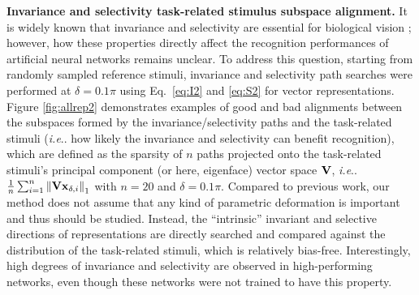 \documentclass[fleqn]{article} %
\makeatletter
\DeclareRobustCommand\onedot{\futurelet\@let@token\@onedot}
\def\@onedot{\ifx\@let@token.\else.\null\fi\xspace}
\def\ie{\emph{i.e}\onedot} \def\Ie{\emph{I.e}\onedot}
\makeatother
\begin{document}
{\bf Invariance and selectivity \vs task-related stimulus subspace alignment.} 
It is widely known that invariance and selectivity are essential for biological vision \cite{desimone1991face, ito1995size}; however, how these properties directly affect the recognition performances of artificial neural networks remains unclear.
To address this question, starting from randomly sampled reference stimuli, invariance and selectivity path searches {were} performed at $\delta = 0.1\pi$ using Eq.~\ref{eq:I2} and \ref{eq:S2} for vector representations. 
Figure \ref{fig:allrep2} demonstrates examples of good and bad alignments between the subspaces formed by the invariance/selectivity paths and the task-related stimuli (\ie how likely the invariance and selectivity can benefit recognition), which are defined as the sparsity of $n$ paths projected onto the task-related stimuli's principal component (or here, eigenface) vector space $\bf{V}$, \ie $\frac{1}{n}\sum_{i=1}^{n} \left\| {\bf{Vx}}_{\delta,i} \right\|_{1}$ with $n=20$ and $\delta=0.1\pi$.
Compared to previous work, our method does not assume that any kind of parametric deformation is important and thus should be studied.
Instead, the ``intrinsic'' invariant and selective directions of representations are directly searched and compared against the distribution of the task-related stimuli, which is relatively bias-free.
Interestingly, high degrees of invariance and selectivity are observed in high-performing networks, even though these networks were not trained to have this property.

\end{document}
